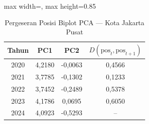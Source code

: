 \begin{table}[H]
\centering
\caption{Pergeseran Posisi Biplot PCA --- Kota Jakarta Pusat} \label{tab:appjarak_pca_skor_kota_jakarta_pusat}
\begin{adjustbox}{max width=\textwidth, max height=0.85\textheight}
\begin{tabular}{|c|c|c|c|}
\hline
\textbf{Tahun} & \textbf{PC1} & \textbf{PC2} & \textbf{$D(\text{pos}_t, \text{pos}_{t+1})$} \\
\hline
2020 & 4,2180 & -0,0063 & 0,4566 \\
2021 & 3,7785 & -0,1302 & 0,1233 \\
2022 & 3,7452 & -0,2489 & 0,5378 \\
2023 & 4,1786 & 0,0695 & 0,6050 \\
2024 & 4,0923 & -0,5293 & -- \\
\hline
\end{tabular}
\end{adjustbox}
\end{table}